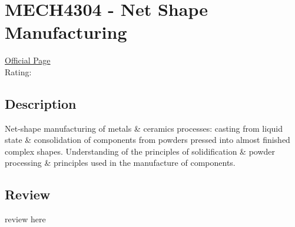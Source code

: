 \hypertarget{MECH4304}{\section{MECH4304 - Net Shape Manufacturing}}

\large
\textcolor{turbo_purple}{\href{https://my.uq.edu.au/programs-courses/course.html?course_code=MECH4304}{Official Page}} \\
Rating: \cstar\cstar\cstar\cstar\ostar

\normalsize
\subsection*{Description}
Net-shape manufacturing of metals \& ceramics processes: casting from liquid state \& consolidation of components from powders pressed into almost finished complex shapes.
Understanding of the principles of solidification \& powder processing \& principles used in the manufacture of components.

\subsection*{Review}
review here
